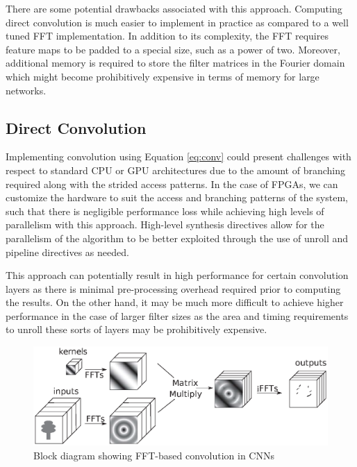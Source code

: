 \documentclass[conference,compsoc]{IEEEtran/IEEEtran}
\begin{document}
There are some potential drawbacks associated with this approach. Computing direct convolution is much easier to implement in practice as compared to a well tuned FFT implementation. In addition to its complexity, the FFT requires feature maps to be padded to a special size, such as a power of two. Moreover, additional memory is required to store the filter matrices in the Fourier domain which might become prohibitively expensive in terms of memory for large networks.

\subsection{Direct Convolution}
Implementing convolution using Equation \ref{eq:conv} could present challenges with respect to standard CPU or GPU architectures
due to the amount of branching required along with the strided access patterns. In the case of FPGAs, we can customize the hardware
to suit the access and branching patterns of the system, such that there is negligible performance loss while achieving high
levels of parallelism with this approach. High-level synthesis directives allow for the parallelism of the algorithm to be better
exploited through the use of unroll and pipeline directives as needed.

This approach can potentially result in high performance for certain convolution layers as there is minimal pre-processing overhead
required prior to computing the results. On the other hand, it may be much more difficult to achieve higher performance in the case of
larger filter sizes as the area and timing requirements to unroll these sorts of layers may be prohibitively expensive.

\begin{figure}[!h]
\begin{center}
\centering
\includegraphics[width=1\columnwidth]{CNN-FFT.eps}
\caption{Block diagram showing FFT-based convolution in CNNs}
\label{CNN-FFT}
\end{center}
\end{figure}
\end{document}
